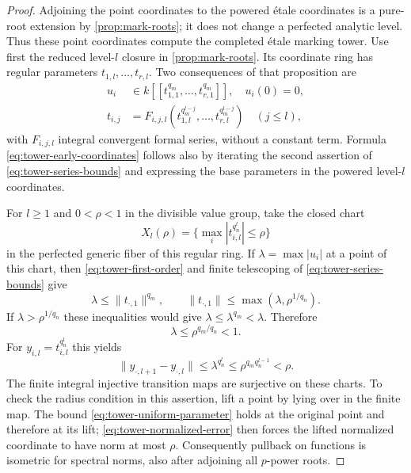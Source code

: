 \begin{proof}
Adjoining the point coordinates to the powered \'{e}tale coordinates
is a pure-root extension by \cref{prop:mark-roots}; it does not change
a perfected analytic level.  Thus these point coordinates compute
the completed \'{e}tale marking tower.  Use first the reduced
level-$l$ closure in \cref{prop:mark-roots}. Its coordinate ring has
regular parameters
$t_{1,l},\ldots,t_{r,l}$. Two consequences of that proposition are
\begin{align}
 u_i&\in k[[t_{1,1}^{q_m},\ldots,t_{r,1}^{q_m}]],
       \quad u_i(0)=0,\label{eq:tower-first-order}\\
 t_{i,j}&=F_{i,j,l}
      (t_{1,l}^{q_m^{l-j}},\ldots,t_{r,l}^{q_m^{l-j}})
       \quad(j\leq l),\label{eq:tower-early-coordinates}
\end{align}
with $F_{i,j,l}$ integral convergent formal series, without a constant
term. Formula \eqref{eq:tower-early-coordinates} follows also by
iterating the second assertion of \eqref{eq:tower-series-bounds}
and expressing the base parameters in the powered level-$l$
coordinates.

For $l\geq1$ and $0<\rho<1$ in the divisible value group, take the closed chart
\[
 X_l(\rho)=
 \{\max_i |t_{i,l}^{q_n^l}|\leq\rho\}
\]
in the perfected generic fiber of this regular ring. If
$\lambda=\max |u_i|$ at a point of this chart, then
\eqref{eq:tower-first-order} and finite telescoping of
\eqref{eq:tower-series-bounds} give
\[
 \lambda\leq\|t_{\cdot,1}\|^{q_m},\qquad
 \|t_{\cdot,1}\|
    \leq\max(\lambda,\rho^{1/q_n}).
\]
If $\lambda>\rho^{1/q_n}$ these inequalities would give
$\lambda\leq\lambda^{q_m}<\lambda$. Therefore
\begin{equation}\label{eq:tower-uniform-parameter}
 \lambda\leq\rho^{q_m/q_n}<1.
\end{equation}
For $y_{i,l}=t_{i,l}^{q_n^l}$ this yields
\begin{equation}\label{eq:tower-normalized-error}
 \|y_{\cdot,l+1}-y_{\cdot,l}\|
   \leq\lambda^{q_n^l}
   \leq\rho^{q_mq_n^{l-1}}<\rho.
\end{equation}
The finite integral injective transition maps are surjective on
these charts. To check the radius condition in this assertion, lift a
point by lying over in the finite map. The bound
\eqref{eq:tower-uniform-parameter} holds at the original point and
therefore at its lift; \eqref{eq:tower-normalized-error} then forces
the lifted normalized coordinate to have norm at most $\rho$.
Consequently pullback on functions is isometric for spectral norms,
also after adjoining all $p$-power roots.


\end{proof}
